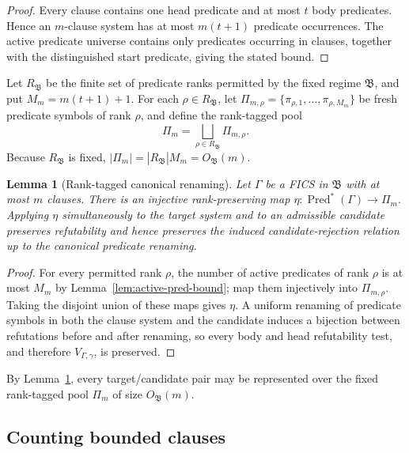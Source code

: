 \documentclass[11pt]{article}
\newtheorem{lemma}[theorem]{Lemma}
\theoremstyle{definition}
\theoremstyle{remark}
\newcommand{\Pred}{\operatorname{Pred}}
\begin{document}
\begin{proof}
Every clause contains one head predicate and at most \(t\) body predicates.
Hence an \(m\)-clause system has at most \(m(t+1)\) predicate occurrences.
The active predicate universe contains only predicates occurring in clauses,
together with the distinguished start predicate, giving the stated bound.
\end{proof}

Let \(R_{\mathfrak B}\) be the finite set of predicate ranks permitted by the
fixed regime \(\mathfrak B\), and put
\(M_m=m(t+1)+1.\)
For each \(\rho\in R_{\mathfrak B}\), let
\(\Pi_{m,\rho} = \{\pi_{\rho,1},\ldots,\pi_{\rho,M_m}\}\)
be fresh predicate symbols of rank \(\rho\), and define the rank-tagged pool
\[
\boxed{
\Pi_m
=
\bigsqcup_{\rho\in R_{\mathfrak B}}\Pi_{m,\rho}.
}
\]
Because \(R_{\mathfrak B}\) is fixed,
\(|\Pi_m| = |R_{\mathfrak B}|M_m = O_{\mathfrak B}(m).\)

\begin{lemma}[Rank-tagged canonical renaming]
\label{lem:canonical-renaming}
Let \(\Gamma\) be a FICS in \(\mathfrak B\) with at most \(m\) clauses. There
is an injective rank-preserving map
\(\eta:\Pred^\ast(\Gamma)\to\Pi_m.\)
Applying \(\eta\) simultaneously to the target system and to an admissible
candidate preserves refutability and hence preserves the induced
candidate-rejection relation up to the canonical predicate renaming.
\end{lemma}

\begin{proof}
For every permitted rank \(\rho\), the number of active predicates of rank
\(\rho\) is at most \(M_m\) by Lemma~\ref{lem:active-pred-bound}; map them
injectively into \(\Pi_{m,\rho}\).  Taking the disjoint union of these maps
gives \(\eta\).  A uniform renaming of predicate symbols in both the clause
system and the candidate induces a bijection between refutations before and
after renaming, so every body and head refutability test, and therefore
\(V_{\Gamma,\gamma}\), is preserved.
\end{proof}

By Lemma~\ref{lem:canonical-renaming}, every target/candidate pair may be
represented over the fixed rank-tagged pool \(\Pi_m\) of size
\(O_{\mathfrak B}(m)\).

\subsection{Counting bounded clauses}
\end{document}
